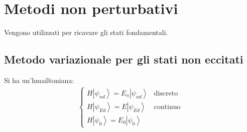 \chapter{Metodi non perturbativi} %
Vengono utilizzati per ricavare gli stati fondamentali.
\section{Metodo variazionale per gli stati non eccitati} %
Si ha un'hmailtoniana:
\begin{equation}\begin{split}
\begin{cases}
H\left |\psi _{nd} \right\rangle=E_n\left |\psi _{nd} \right\rangle & \textrm{discreto}\\
H\left |\psi _{Ed} \right\rangle=E\left |\psi _{Ed} \right\rangle & \textrm{continuo}\\
H\left |\psi _0 \right\rangle=E_0\left |\psi _0 \right\rangle
\end{cases}
\end{split}\end{equation}

